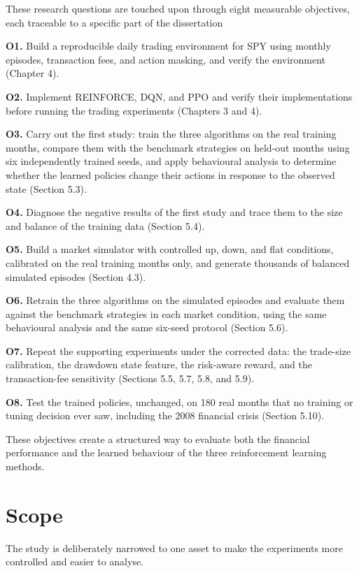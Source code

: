 These research questions are touched upon through eight measurable
objectives, each traceable to a specific part of the dissertation

\textbf{O1.} Build a reproducible daily trading environment for SPY
using monthly episodes, transaction fees, and action masking, and verify
the environment (Chapter 4).

\textbf{O2.} Implement REINFORCE, DQN, and PPO and verify their
implementations before running the trading experiments (Chapters 3
and 4).

\textbf{O3.} Carry out the first study: train the three algorithms on
the real training months, compare them with the benchmark strategies on
held-out months using six independently trained seeds, and apply
behavioural analysis to determine whether the learned policies change
their actions in response to the observed state (Section 5.3).

\textbf{O4.} Diagnose the negative results of the first study and trace
them to the size and balance of the training data (Section 5.4).

\textbf{O5.} Build a market simulator with controlled up, down, and
flat conditions, calibrated on the real training months only, and
generate thousands of balanced simulated episodes (Section 4.3).

\textbf{O6.} Retrain the three algorithms on the simulated episodes and
evaluate them against the benchmark strategies in each market
condition, using the same behavioural analysis and the same six-seed
protocol (Section 5.6).

\textbf{O7.} Repeat the supporting experiments under the corrected
data: the trade-size calibration, the drawdown state feature, the
risk-aware reward, and the transaction-fee sensitivity (Sections 5.5,
5.7, 5.8, and 5.9).

\textbf{O8.} Test the trained policies, unchanged, on 180 real months
that no training or tuning decision ever saw, including the 2008
financial crisis (Section 5.10).

These objectives create a structured way to evaluate both the financial
performance and the learned behaviour of the three reinforcement
learning methods.

\section{Scope}

The study is deliberately narrowed to one asset to make the experiments
more controlled and easier to analyse.

